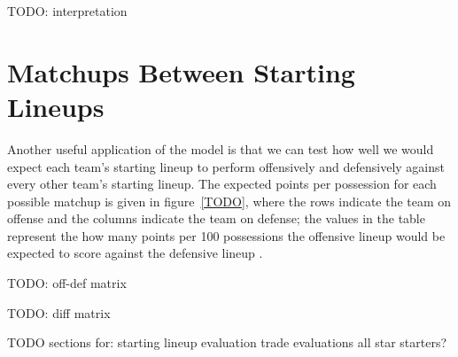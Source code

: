 TODO: interpretation

\section{Matchups Between Starting Lineups}

Another useful application of the model is that we can test how well we would expect
each team's starting lineup to perform offensively and defensively against every
other team's starting lineup. The expected points per possession for each possible
matchup is given in figure~\ref{TODO}, where the rows indicate the team on offense
and the columns indicate the team on defense; the values in the table represent the
how many points per 100 possessions the offensive lineup would be expected to score
against the defensive lineup \citep{Knuth1968}.

TODO: off-def matrix


TODO: diff matrix


TODO sections for:
starting lineup evaluation
trade evaluations
all star starters?
